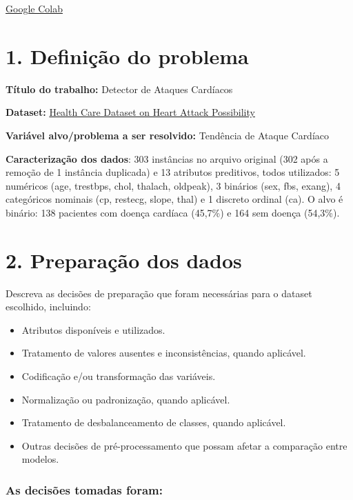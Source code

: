 \documentclass[11pt,letterpaper]{article}
\begin{document}
\href{https://colab.research.google.com/drive/1RlvYrCOHP42hWTWEHPSErE1awk6hvJ6-?usp=sharing}{Google Colab}

\section*{1. Definição do problema}

\textbf{Título do trabalho:} Detector de Ataques Cardíacos

\textbf{Dataset:}  \href{https://www.kaggle.com/datasets/nareshbhat/health-care-data-set-on-heart-attack-possibility}{Health Care Dataset on Heart Attack Possibility}

\textbf{Variável alvo/problema a ser resolvido:}  Tendência de Ataque Cardíaco

\textbf{Caracterização dos dados}: 303 instâncias no arquivo original (302 após a remoção de 1 instância duplicada) e 13 atributos preditivos, todos utilizados: 5 numéricos (age, trestbps, chol, thalach, oldpeak), 3 binários (sex, fbs, exang), 4 categóricos nominais (cp, restecg, slope, thal) e 1 discreto ordinal (ca). O alvo é binário: 138 pacientes com doença cardíaca (45,7\%) e 164 sem doença (54,3\%).

\section*{2. Preparação dos dados}

Descreva as decisões de preparação que foram necessárias para o dataset escolhido, incluindo:

\begin{itemize}
\item Atributos disponíveis e utilizados.
\item Tratamento de valores ausentes e inconsistências, quando aplicável.
\item Codificação e/ou transformação das variáveis.
\item Normalização ou padronização, quando aplicável.
\item Tratamento de desbalanceamento de classes, quando aplicável.
\item Outras decisões de pré-processamento que possam afetar a comparação entre modelos.
\end{itemize}

\subsubsection*{As decisões tomadas foram:}
\end{document}
